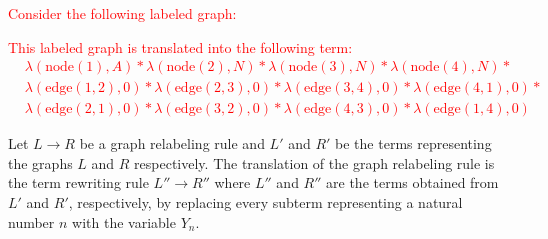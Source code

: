      
\textcolor{red}{
    \begin{example}
        Consider the following labeled graph:
        This labeled graph is translated into the following term:
        \begin{align*}
            &\lambda(\text{node}(1),A) * \lambda(\text{node}(2),N) * \lambda(\text{node}(3),N) * \lambda(\text{node}(4),N) * \\
            &\lambda(\text{edge}(1,2),0) * \lambda(\text{edge}(2,3),0) * \lambda(\text{edge}(3,4),0) * \lambda(\text{edge}(4,1),0) * \\
            &\lambda(\text{edge}(2,1),0) * \lambda(\text{edge}(3,2),0) * \lambda(\text{edge}(4,3),0) * \lambda(\text{edge}(1,4),0)
        \end{align*}
    \end{example}
}

\begin{definition}
    \label{def:gls_to_actrs:rules}
    Let $L \mathop{\rightarrow} R$ be a graph relabeling rule and $L'$ and $R'$ be the terms representing the graphs $L$ and $R$ respectively. The translation of the graph relabeling rule is the term rewriting rule $L'' \mathop{\rightarrow} R''$ where $L''$ and $R''$ are the terms obtained from $L'$ and $R'$, respectively, by replacing every subterm representing a natural number $n$ with the variable $Y_n$.
\end{definition}

